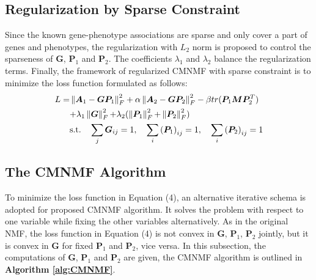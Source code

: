 \documentclass{bmcart}
\begin{document}
\subsection*{\textbf{Regularization by Sparse Constraint}}
Since the known gene-phenotype associations are sparse and only cover a part of genes and phenotypes, the regularization with $L_2$ norm is proposed to control the sparseness of $\bm{G}$, $\bm{P}_1$ and $\bm{P}_2$. The coefficients ${\lambda_1}$ and $\lambda_2$ balance the regularization terms. Finally, the framework of regularized CMNMF with sparse constraint is to minimize the loss function formulated as follows:
\begin{equation}\label{equ:R-CMNMF}
\begin{split}
L=
&\left\| {{\bm{A}_1} - \bm{G}{\bm{P}_1}} \right\|_F^2 + \alpha \left\| {{\bm{A}_2} - \bm{G}{\bm{P}_2}} \right\|_F^2 - \beta  tr({\bm{P}_1}\bm{MP}_2^T)\\
&{\rm{ + }}{\lambda _1}\left\| \bm{G} \right\|_F^2{\rm{ + }}{\lambda _2}(\left\| {{\bm{P}_1}} \right\|_F^2{\rm{ + }}\left\| {{\bm{P}_2}} \right\|_F^2)\\
&\mathrm{s.t. }\quad \sum_j\bm{G}_{ij}=1,\quad \sum_i{(\bm{P}_1)}_{ij}=1,\quad \sum_i{(\bm{P}_2)}_{ij}=1
\end{split}
\end{equation}

\subsection*{\textbf{The CMNMF Algorithm}}
To minimize the loss function in Equation (4), an alternative iterative schema is adopted for proposed CMNMF algorithm. It solves the problem with respect to one variable while fixing the other variables alternatively. As in the original NMF, the loss function in Equation (4) is not convex in $\bm{G}$, $\bm{P}_1$, $\bm{P}_2$ jointly, but it is convex in $\bm{G}$ for fixed $\bm{P}_1$ and $\bm{P}_2$, vice versa. In this subsection, the computations of $\bm{G}$, $\bm{P}_1$ and $\bm{P}_2$ are given, the CMNMF algorithm is outlined in \textbf{Algorithm \ref{alg:CMNMF}}.
\end{document}
